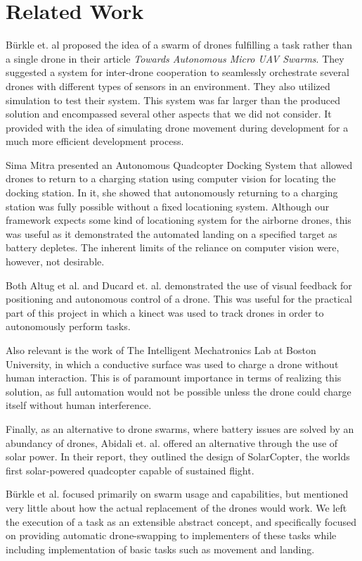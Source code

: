 \section{Related Work}
B\"urkle et. al proposed the idea of a swarm of drones fulfilling a task rather than a single drone in their article \textit{Towards Autonomous Micro UAV Swarms}\cite{burkleetal}. They suggested a system for inter-drone cooperation to seamlessly orchestrate several drones with different types of sensors in an environment. They also utilized simulation to test their system. This system was far larger than the produced solution and encompassed several other aspects that we did not consider. It provided with the idea of simulating drone movement during development for a much more efficient development process.

Sima Mitra presented an Autonomous Quadcopter Docking System\cite{simamitra} that allowed drones to return to a charging station using computer vision for locating the docking station. In it, she showed that autonomously returning to a charging station was fully possible without a fixed locationing system. Although our framework expects some kind of locationing system for the airborne drones, this was useful as it demonstrated the automated landing on a specified target as battery depletes. The inherent limits of the reliance on computer vision were, however, not desirable.

Both Altug et al.\cite{altugetal} and Ducard et. al.\cite{ducardetal} demonstrated the use of visual feedback for positioning and autonomous control of a drone. This was useful for the practical part of this project in which a kinect was used to track drones in order to autonomously perform tasks.

Also relevant is the work of The Intelligent Mechatronics Lab at Boston University, in which a conductive surface was used to charge a drone without human interaction\cite{bostonuni}. This is of paramount importance in terms of realizing this solution, as full automation would not be possible unless the drone could charge itself without human interference.

Finally, as an alternative to drone swarms, where battery issues are solved by an abundancy of drones, Abidali et. al.\cite{solarcopter} offered an alternative through the use of solar power. In their report, they outlined the design of SolarCopter, the worlds first solar-powered quadcopter capable of sustained flight.

B\"urkle et al. focused primarily on swarm usage and capabilities, but mentioned very little about how the actual replacement of the drones would work. We left the execution of a task as an extensible abstract concept, and specifically focused on providing automatic drone-swapping to implementers of these tasks while including implementation of basic tasks such as movement and landing.


